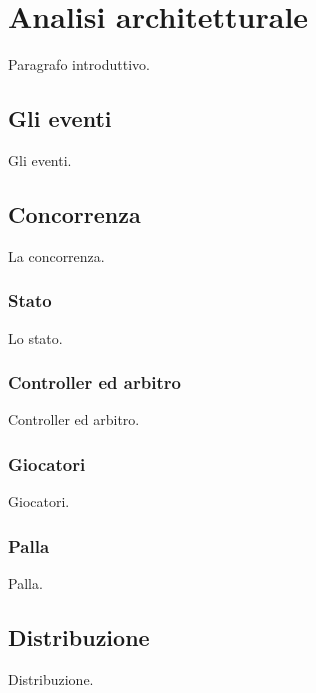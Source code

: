 
\section*{Analisi architetturale}
%
\label{sec:analisi_architetturale}

Paragrafo introduttivo.

\subsection*{Gli eventi}
%
\label{sec:analisi_eventi}

Gli eventi.

\subsection*{Concorrenza}
%
\label{sec:analisi_concorrenza}

La concorrenza.

\subsubsection*{Stato}
%
\label{sec:analisi_concorrenza_stato}

Lo stato.

\subsubsection*{Controller ed arbitro}
%
\label{sec:analisi_concorrenza_controller_arbitro}

Controller ed arbitro.

\subsubsection*{Giocatori}
%
\label{sec:analisi_concorrenza_giocatori}

Giocatori.

\subsubsection*{Palla}
%
\label{sec:analisi_concorrenza_palla}

Palla.

\subsection*{Distribuzione}
%
\label{sec:analisi_distribuzione}

Distribuzione.



